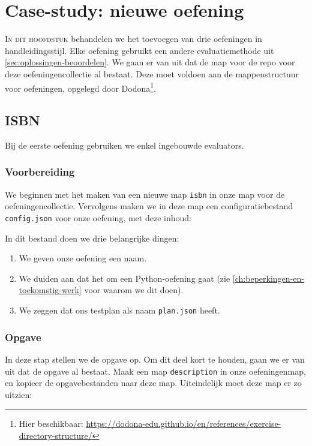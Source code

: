 \chapter{Case-study: nieuwe oefening}\label{ch:nieuwe-oefening}

\lettrine{I}{n dit hoofdstuk} behandelen we het toevoegen van drie oefeningen in handleidingsstijl.
Elke oefening gebruikt een andere evaluatiemethode uit \cref{sec:oplossingen-beoordelen}.
We gaan er van uit dat de map voor de repo voor deze oefeningencollectie al bestaat.
Deze moet voldoen aan de mappenstructuur voor oefeningen, opgelegd door Dodona\footnote{Hier beschikbaar: \url{https://dodona-edu.github.io/en/references/exercise-directory-structure/}}.

\section{ISBN}\label{sec:isbn}

Bij de eerste oefening gebruiken we enkel ingebouwde evaluators.

\subsection{Voorbereiding}\label{subsec:voorbereiding}

We beginnen met het maken van een nieuwe map \texttt{isbn} in onze map voor de oefeningencollectie.
Vervolgens maken we in deze map een configuratiebestand \texttt{config.json} voor onze oefening, met deze inhoud:


In dit bestand doen we drie belangrijke dingen:
\begin{enumerate}
    \item We geven onze oefening een naam.
    \item We duiden aan dat het om een Python-oefening gaat (zie \cref{ch:beperkingen-en-toekomstig-werk} voor waarom we dit doen).
    \item We zeggen dat ons testplan als naam \texttt{plan.json} heeft.
\end{enumerate}

\subsection{Opgave}\label{subsec:opgave}

In deze stap stellen we de opgave op.
Om dit deel kort te houden, gaan we er van uit dat de opgave al bestaat.
Maak een map \texttt{description} in onze oefeningenmap, en kopieer de opgavebestanden naar deze map.
Uiteindelijk moet deze map er zo uitzien:

